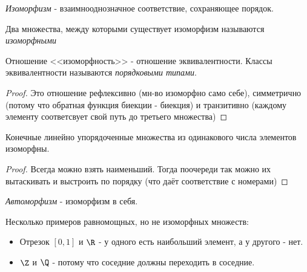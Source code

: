 
\begin{definition} \thmslashn

	\textit{Изоморфизм} - взаимнооднозначное соответствие, сохраняющее порядок.
	
	Два множества, между которыми существует изоморфизм называются \textit{изоморфными}
\end{definition}

\begin{lemma} \thmslashn

	Отношение <<изоморфность>> - отношение эквивалентности. Классы эквивалентности называются \textit{порядковыми типами}.
	\begin{proof} \thmslashn
		
		Это отношение рефлексивно (мн-во изоморфно само себе), симметрично (потому что обратная функция биекции - биекция) и транзитивно (каждому элементу соответсвует свой путь до третьего множества)
	\end{proof}
\end{lemma}

\begin{theorem} \thmslashn

	Конечные линейно упорядоченные множества из одинакового числа элементов изоморфны.
	\begin{proof} \thmslashn
	
		Всегда можно взять наименьший. Тогда поочереди так можно их вытаскивать и выстроить по порядку (что даёт соответствие с номерами)
	\end{proof}
\end{theorem}

\begin{definition} \thmslashn

	\textit{Автоморфизм} - изоморфизм в себя.
\end{definition}

Несколько примеров равномощных, но не изоморфных множеств:
\begin{itemize}
	\item
		Отрезок $[0, 1]$ и $\R$ - у одного есть наибольший элемент, а у другого - нет.
	\item
		$\Z$ и $\Q$ - потому что соседние должны переходить в соседние.
\end{itemize}


